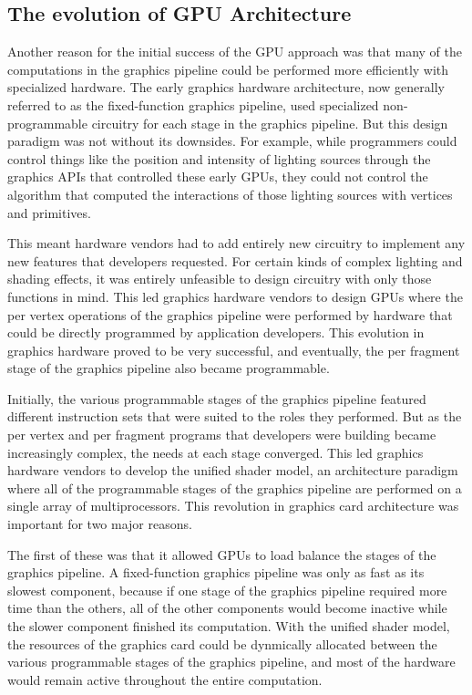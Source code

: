\documentclass[12pt,twoside]{reedthesis}
\begin{document}
\subsection{The evolution of GPU Architecture}

Another reason for the initial success of the GPU approach was that many of the computations in the graphics pipeline could be performed more efficiently with specialized hardware. The early graphics hardware architecture, now generally referred to as the fixed-function graphics pipeline, used specialized non-programmable circuitry for each stage in the graphics pipeline. But this design paradigm was not without its downsides. For example, while programmers could control things like the position and intensity of lighting sources through the graphics APIs that controlled these early GPUs, they could not control the algorithm that computed the interactions of those lighting sources with vertices and primitives.

This meant hardware vendors had to add entirely new circuitry to implement any new features that developers requested. For certain kinds of complex lighting and shading effects, it was entirely unfeasible to design circuitry with only those functions in mind. This led graphics hardware vendors to design GPUs where the per vertex operations of the graphics pipeline were performed by hardware that could be directly programmed by application developers. This evolution in graphics hardware proved to be very successful, and eventually, the per fragment stage of the graphics pipeline also became programmable.

Initially, the various programmable stages of the graphics pipeline featured different instruction sets that were suited to the roles they performed. But as the per vertex and per fragment programs that developers were building became increasingly complex, the needs at each stage converged. This led graphics hardware vendors to develop the unified shader model, an architecture paradigm where all of the programmable stages of the graphics pipeline are performed on a single array of multiprocessors. This revolution in graphics card architecture was important for two major reasons.

The first of these was that it allowed GPUs to load balance the stages of the graphics pipeline. A fixed-function graphics pipeline was only as fast as its slowest component, because if one stage of the graphics pipeline required more time than the others, all of the other components would become inactive while the slower component finished its computation. With the unified shader model, the resources of the graphics card could be dynmically allocated between the various programmable stages of the graphics pipeline, and most of the hardware would remain active throughout the entire computation.
\end{document}
